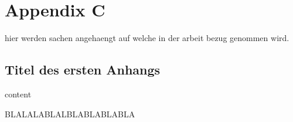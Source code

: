 \chapter{Appendix C}
\label{chap:AppendixC}

hier werden sachen angehaengt auf welche in der arbeit bezug genommen wird.

\section{Titel des ersten Anhangs}
\label{sec:Titel des ersten Anhangs}


content


BLALALABLALBLABLABLABLA





